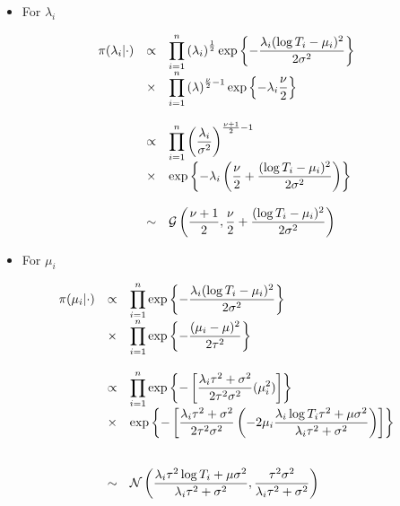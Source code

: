 \documentclass{asaproc}
\begin{document}
\begin{itemize}
\item For $\lambda_i$
\end{itemize}
\begin{small}
\begin{eqnarray*}
\begin{array}{lcl ll }

\pi(\lambda_i|\cdot) & \propto & \displaystyle\prod_{i=1}^{n}  \left(\lambda_i\right)^{\frac{1}{2}}\mbox{exp}\left\{ -\dfrac{ \lambda_i(\log T_i - \mu_i)^2}{2\sigma^2} \right\} \\
& \times & \displaystyle\prod_{i=1}^{n} \left(\lambda\right)^{\frac{\nu}{2}-1}\mbox{exp}\left\{ -\lambda_i \dfrac{\nu}{2}\right\} \\ \\

& \propto &\displaystyle\prod_{i=1}^{n}  \left(\dfrac{\lambda_i}{\sigma^2}\right)^{\frac{\nu + 1}{2}-1} \\
& \times &\mbox{exp}\left\{ - \lambda_i \left( \dfrac{\nu}
{2} + \dfrac{(\log T_i - \mu_i)^2}{2\sigma^2} \right) \right\}\\ \\

& \sim & \mathcal{G}\left( \dfrac{\nu +1}{2}, \dfrac{\nu}{2} + \dfrac{(\log T_i - \mu_i)^2}{2\sigma^2} \right) 
\end{array}
\end{eqnarray*}
\end{small}

\begin{itemize}
\item For $\mu_i$
\end{itemize}
\begin{small}
\begin{eqnarray*}
\begin{array}{lcl ll }
\pi(\mu_i|\cdot) & \propto &\displaystyle\prod_{i=1}^{n} \mbox{exp}\left\{ -\dfrac{ \lambda_i(\log T_i - \mu_i)^2}{2\sigma^2} \right\} \\
& \times & \displaystyle\prod_{i=1}^{n} \mbox{exp}\left\{ -\dfrac{(\mu_i - \mu)^2}{2\tau^2}\right\}  \\ \\
& \propto &\displaystyle\prod_{i=1}^{n} \mbox{exp}\left\{ - \left[ \dfrac{\lambda_i\tau^2 + \sigma^2}{2\tau^2\sigma^2}(\mu_i^2) \right] \right\} \\
& \times & \mbox{exp}\left\{ - \left[ \dfrac{\lambda_i\tau^2 + \sigma^2}{2\tau^2\sigma^2}\left( -2\mu_i \dfrac{\lambda_i\log T_i \tau^2 + \mu\sigma^2}{\lambda_i\tau^2 + \sigma^2} \right) \right] \right\} \\ \\ \\
& \sim & \mathcal{N}\left( \dfrac{\lambda_i \tau^2\log T_i + \mu\sigma^2}{\lambda_i\tau^2+\sigma^2}, \dfrac{\tau^2\sigma^2}{\lambda_i\tau^2 + \sigma^2} \right) \\ \\

\end{array}
\end{eqnarray*}
\end{small}
\end{document}
